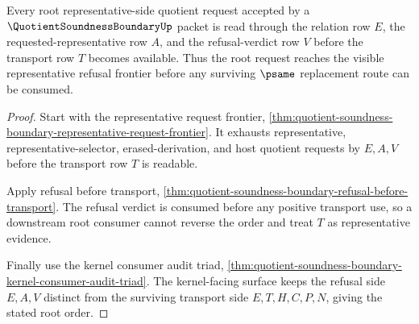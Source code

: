 \begin{theorem}
\label{thm:quotient-soundness-boundary-root-representative-refusal}
Every root representative-side quotient request accepted by a $\QuotientSoundnessBoundaryUp$ packet is read through the relation row $E$, the requested-representative row $A$, and the refusal-verdict row $V$ before the transport row $T$ becomes available. Thus the root request reaches the visible representative refusal frontier before any surviving $\psame$ replacement route can be consumed.
\end{theorem}
\begin{proof}
Start with the representative request frontier, \autoref{thm:quotient-soundness-boundary-representative-request-frontier}. It exhausts representative, representative-selector, erased-derivation, and host quotient requests by $E,A,V$ before the transport row $T$ is readable.

Apply refusal before transport, \autoref{thm:quotient-soundness-boundary-refusal-before-transport}. The refusal verdict is consumed before any positive transport use, so a downstream root consumer cannot reverse the order and treat $T$ as representative evidence.

Finally use the kernel consumer audit triad, \autoref{thm:quotient-soundness-boundary-kernel-consumer-audit-triad}. The kernel-facing surface keeps the refusal side $E,A,V$ distinct from the surviving transport side $E,T,H,C,P,N$, giving the stated root order.
\end{proof}

